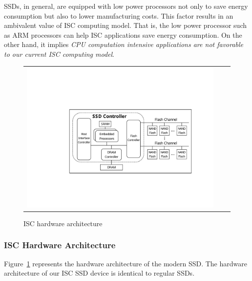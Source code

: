 SSDs, in general, are equipped with low power processors not only to save energy consumption but also to lower manufacturing costs. This factor results in an ambivalent value of ISC computing model. That is, the low power processor such as ARM processors can help ISC applications save energy consumption. On the other hand, it implies \emph{CPU computation intensive applications are not favorable to our current ISC computing model}.


\begin{figure}[htbp]
  \centering
  \begin{tabular}{ccc}
 \includegraphics[width=0.99\columnwidth]{figures/ISC_HW_architecture.pdf}
\end{tabular}
  \caption{ISC hardware architecture}
  \label{fig:SSDInternals}
 \end{figure}


\subsubsection{ISC Hardware Architecture}\label{sec:SSDhw}
Figure~\ref{fig:SSDInternals} represents the hardware architecture of the modern SSD. The hardware architecture of our ISC SSD device is identical to regular SSDs.

